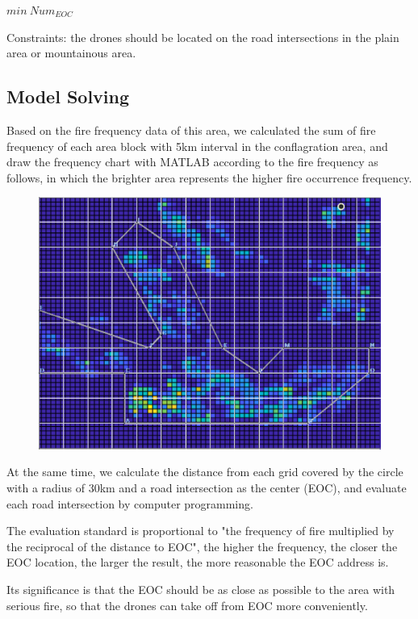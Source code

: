 \documentclass{mcmthesis}
\begin{document}
\begin{center}
  $min\ Num_{EOC}$
\end{center}


Constraints: the drones should be located on the road intersections in the plain area or mountainous area.

\subsection{Model Solving}

Based on the fire frequency data of this area, we calculated the sum of fire frequency of each area block with 5km interval in the conflagration area, and draw the frequency chart with MATLAB according to the fire frequency as follows, in which the brighter area represents the higher fire occurrence frequency.

\begin{figure}[H]
  \centering
  \includegraphics[scale=0.4]{image/5.png}
\end{figure}

At the same time, we calculate the distance from each grid covered by the circle with a radius of 30km and a road intersection as the center (EOC), and evaluate each road intersection by computer programming.

The evaluation standard is proportional to "the frequency of fire multiplied by the reciprocal of the distance to EOC", the higher the frequency, the closer the EOC location, the larger the result, the more reasonable the EOC address is.

Its significance is that the EOC should be as close as possible to the area with serious fire, so that the drones can take off from EOC more conveniently.
\end{document}
